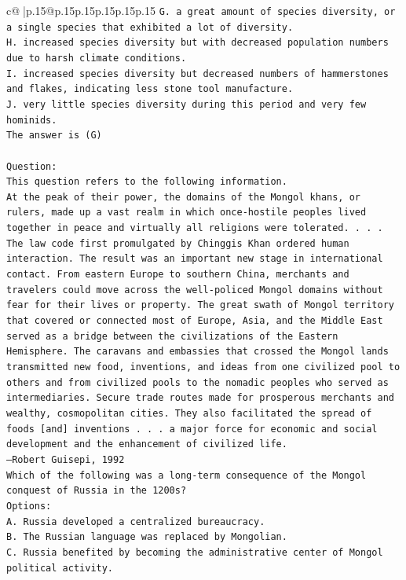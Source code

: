 \documentclass{article}
\begin{document}
{\begin{supertabular}{c@{$\;$}|p{.15\linewidth}@{}p{.15\linewidth}p{.15\linewidth}p{.15\linewidth}p{.15\linewidth}p{.15\linewidth}}
{{{\texttt{G. a great amount of species diversity, or a single species that exhibited a lot of diversity.} \\
\texttt{H. increased species diversity but with decreased population numbers due to harsh climate conditions.} \\
\texttt{I. increased species diversity but decreased numbers of hammerstones and flakes, indicating less stone tool manufacture.} \\
\texttt{J. very little species diversity during this period and very few hominids.} \\
\texttt{The answer is (G)} \\
\\ 
\texttt{Question:} \\
\texttt{This question refers to the following information.} \\
\texttt{At the peak of their power, the domains of the Mongol khans, or rulers, made up a vast realm in which once{-}hostile peoples lived together in peace and virtually all religions were tolerated. . . . The law code first promulgated by Chinggis Khan ordered human interaction. The result was an important new stage in international contact. From eastern Europe to southern China, merchants and travelers could move across the well{-}policed Mongol domains without fear for their lives or property. The great swath of Mongol territory that covered or connected most of Europe, Asia, and the Middle East served as a bridge between the civilizations of the Eastern Hemisphere. The caravans and embassies that crossed the Mongol lands transmitted new food, inventions, and ideas from one civilized pool to others and from civilized pools to the nomadic peoples who served as intermediaries. Secure trade routes made for prosperous merchants and wealthy, cosmopolitan cities. They also facilitated the spread of foods {[}and{]} inventions . . . a major force for economic and social development and the enhancement of civilized life.} \\
\texttt{—Robert Guisepi, 1992} \\
\texttt{Which of the following was a long{-}term consequence of the Mongol conquest of Russia in the 1200s?} \\
\texttt{Options:} \\
\texttt{A. Russia developed a centralized bureaucracy.} \\
\texttt{B. The Russian language was replaced by Mongolian.} \\
\texttt{C. Russia benefited by becoming the administrative center of Mongol political activity.} \\
}}}
\end{supertabular}}
\end{document}
